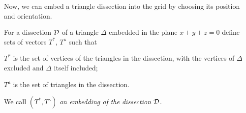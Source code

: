 Now, we can embed a triangle dissection into the grid by choosing its position and orientation.

\begin{defn}
For a dissection $\mathcal D$ of a triangle $\Delta$ embedded in the plane $x+y+z=0$ define sets of vectors $T^*$, $T^\vartriangle$ such that
\begin{cosyitemize}
	\item $T^*$ is the set of vertices of the triangles in the dissection, with the vertices of $\Delta$ excluded and $\Delta$ itself included;
	\item $T^\vartriangle$ is the set of triangles in the dissection.
\end{cosyitemize}%
We call $(T^*, T^\vartriangle)$ \emph{an embedding of the dissection $\mathcal D$.}
\end{defn}

